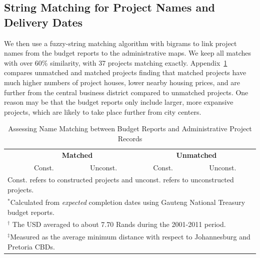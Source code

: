 \documentclass[12pt]{article}
\begin{document}
\subsection{String Matching for Project Names and Delivery Dates }
\label{appendix:stringmatch}


We then use a fuzzy-string matching algorithm with bigrams to link project names from the budget reports to the administrative maps.  We keep all matches with over 60\% similarity, with 37 projects matching exactly.  Appendix~\ref{table:stringmatch} compares unmatched and matched projects finding that matched projects have much higher numbers of project houses, lower nearby housing prices, and are further from the central business district compared to unmatched projects.  One reason may be that the budget reports only include larger, more expansive projects, which are likely to take place further from city centers. 


\vspace{0mm}
\begin{table}[ht!]
\centering
\caption{Assessing Name Matching between Budget Reports and Administrative Project Records}\label{table:stringmatch}
\vspace{0mm}
\begin{tabular}{l*{1}{cccc}}
\toprule
  & \multicolumn{2}{c}{\textbf{Matched}}& \multicolumn{2}{c}{\textbf{Unmatched}}    \\
  &Const. & Unconst. &Const. & Unconst.  \\
\midrule

\bottomrule
\multicolumn{5}{l}{\scriptsize Const. refers to constructed projects and unconst. refers to unconstructed projects.}\\[-.5em]
\multicolumn{5}{l}{\scriptsize $^*$Calculated from {\it expected} completion dates using Gauteng National Treasury budget reports.}\\[-.5em]
\multicolumn{5}{l}{\scriptsize $^\dagger$ The USD averaged to about 7.70 Rands during the 2001-2011 period.}\\[-.5em]
\multicolumn{5}{l}{\scriptsize $^\ddagger$Measured as the average minimum distance with respect to Johannesburg and Pretoria CBDs. } \\[-.5em]
\end{tabular}
\end{table} 
\end{document}
